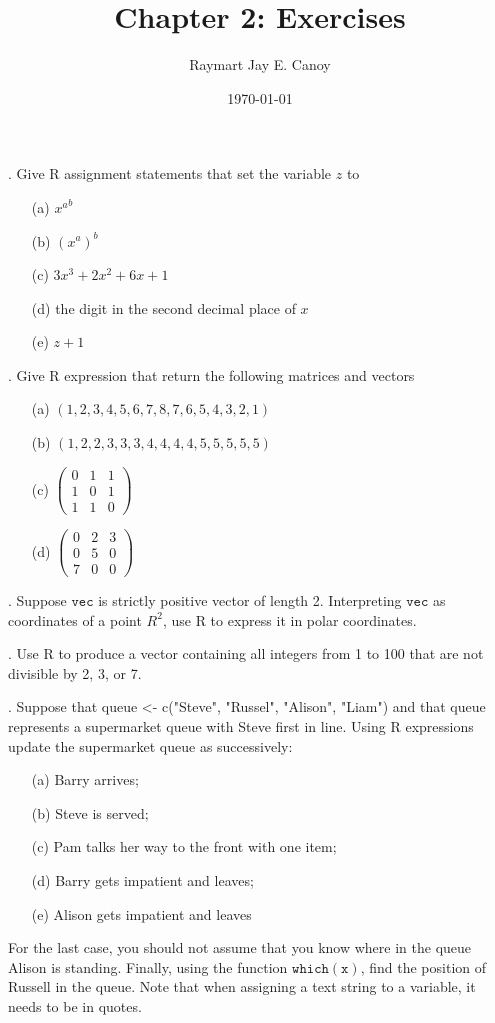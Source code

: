 \documentclass[a4paper, 12pt]{article}
\begin{document}
\title{\textbf{Chapter 2: Exercises}}
\author{Raymart Jay E. Canoy}
\date{\today}
\maketitle

. Give R assignment statements that set the variable $z$ to
\begin{itemize}
\item[(a)]{${x^{a}}^{b}$}
\item[(b)]{$(x^{a})^{b}$}
\item[(c)]{$3x^{3}+2x^{2}+6x+1$}
\item[(d)]{the digit in the second decimal place of $x$}
\item[(e)]{$z+1$}
\end{itemize}

. Give R expression that return the following matrices and vectors
\begin{itemize}
\item[(a)]{$(1,2,3,4,5,6,7,8,7,6,5,4,3,2,1)$}
\item[(b)]{$(1,2,2,3,3,3,4,4,4,4,5,5,5,5,5)$}
\item[(c)]{$\begin{pmatrix}
0 & 1 & 1\\
1 & 0 & 1\\
1 & 1 & 0
\end{pmatrix}$}
\item[(d)]{$\begin{pmatrix}
0 & 2 & 3 \\
0 & 5 & 0 \\
7 & 0 & 0
\end{pmatrix}$}
\end{itemize}


. Suppose $\mathtt{vec}$ is strictly positive vector of length 2. Interpreting $\mathtt{vec}$ as coordinates of a point $R^{2}$, use R to express it in polar coordinates.


. Use R to produce a vector containing all integers from 1 to 100 that are not divisible by 2, 3, or 7.

. Suppose that queue <- c("Steve", "Russel", "Alison", "Liam") and that queue represents a supermarket queue with Steve first in line. Using R expressions update the supermarket queue as successively:
\begin{itemize}
\item[(a)]{Barry arrives;}
\item[(b)]{Steve is served;}
\item[(c)]{Pam talks her way to the front with one item;}
\item[(d)]{Barry gets impatient and leaves;}
\item[(e)]{Alison gets impatient and leaves}
\end{itemize}
\noindent For the last case, you should not assume that you know where in the queue Alison is standing. Finally, using the function $\mathtt{which(x)}$, find the position of Russell in the queue. Note that when assigning a text string to a variable, it needs to be in quotes.
\end{document}
